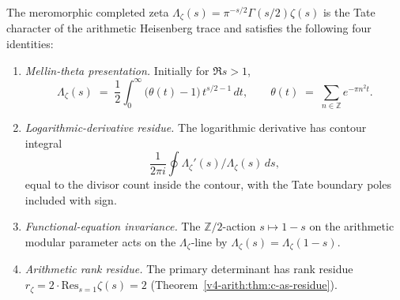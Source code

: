 \begin{theorem}
\label{v4-arith:thm:P2-resolution}
The meromorphic completed zeta
\(\Lambda_{\zeta}(s)=\pi^{-s/2}\Gamma(s/2)\zeta(s)\) is the Tate
character of the arithmetic Heisenberg trace and satisfies the
following four identities:
\begin{enumerate}
\item \emph{Mellin-theta presentation.} Initially for \(\Re s>1\),
\begin{equation}
\Lambda_{\zeta}(s)\;=\;\frac{1}{2}\int_{0}^{\infty}\bigl(\theta(t)-1\bigr)\,t^{s/2-1}\,dt,\qquad\theta(t)\;=\;\sum_{n\in\mathbb{Z}}e^{-\pi n^{2}t}.
\end{equation}
\item \emph{Logarithmic-derivative residue.} The logarithmic
derivative has contour integral
\begin{equation}
\frac{1}{2\pi i}\oint\Lambda_{\zeta}'(s)/\Lambda_{\zeta}(s)\,ds,
\end{equation}
equal to the divisor count inside the contour, with the Tate boundary
poles included with sign.
\item \emph{Functional-equation invariance.} The \(\mathbb{Z}/2\)-action
\(s\mapsto 1-s\) on the arithmetic modular parameter acts on the
\(\Lambda_{\zeta}\)-line by \(\Lambda_{\zeta}(s)=\Lambda_{\zeta}(1-s)\).
\item \emph{Arithmetic rank residue.} The primary determinant has
rank residue
\(r_{\zeta}=2\cdot\mathrm{Res}_{s=1}\zeta(s)=2\)
(Theorem~\ref{v4-arith:thm:c-as-residue}).
\end{enumerate}
\end{theorem}

